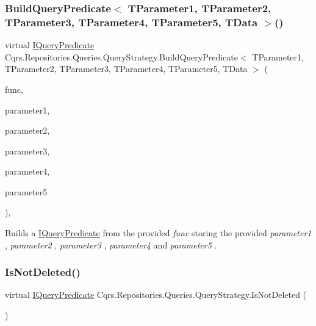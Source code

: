 \subsubsection{\texorpdfstring{Build\+Query\+Predicate$<$ T\+Parameter1, T\+Parameter2, T\+Parameter3, T\+Parameter4, T\+Parameter5, T\+Data $>$()}{BuildQueryPredicate< TParameter1, TParameter2, TParameter3, TParameter4, TParameter5, TData >()}}
{\footnotesize\ttfamily virtual \hyperlink{interfaceCqrs_1_1Repositories_1_1Queries_1_1IQueryPredicate}{I\+Query\+Predicate} Cqrs.\+Repositories.\+Queries.\+Query\+Strategy.\+Build\+Query\+Predicate$<$ T\+Parameter1, T\+Parameter2, T\+Parameter3, T\+Parameter4, T\+Parameter5, T\+Data $>$ (\begin{DoxyParamCaption}\item[{Func$<$ T\+Parameter1, T\+Parameter2, T\+Parameter3, T\+Parameter4, T\+Parameter5, T\+Data $>$}]{func,  }\item[{T\+Parameter1}]{parameter1,  }\item[{T\+Parameter2}]{parameter2,  }\item[{T\+Parameter3}]{parameter3,  }\item[{T\+Parameter4}]{parameter4,  }\item[{T\+Parameter5}]{parameter5 }\end{DoxyParamCaption})\hspace{0.3cm}{\ttfamily [protected]}, {\ttfamily [virtual]}}



Builds a \hyperlink{interfaceCqrs_1_1Repositories_1_1Queries_1_1IQueryPredicate}{I\+Query\+Predicate} from the provided {\itshape func}  storing the provided {\itshape parameter1} , {\itshape parameter2} , {\itshape parameter3} , {\itshape parameter4}  and {\itshape parameter5} . 

\mbox{\label{classCqrs_1_1Repositories_1_1Queries_1_1QueryStrategy_aa872cafb9c17c9ea9d933be2ba209a6b_aa872cafb9c17c9ea9d933be2ba209a6b}} 
\subsubsection{\texorpdfstring{Is\+Not\+Deleted()}{IsNotDeleted()}}
{\footnotesize\ttfamily virtual \hyperlink{interfaceCqrs_1_1Repositories_1_1Queries_1_1IQueryPredicate}{I\+Query\+Predicate} Cqrs.\+Repositories.\+Queries.\+Query\+Strategy.\+Is\+Not\+Deleted (\begin{DoxyParamCaption}{ }\end{DoxyParamCaption})\hspace{0.3cm}{\ttfamily [virtual]}}



